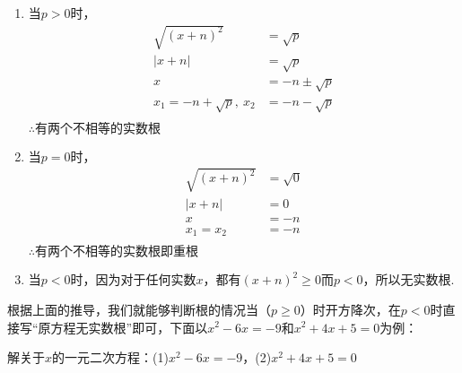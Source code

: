 \begin{enumerate}
    \item 当\(p>0\)时，
    \begin{align*}
        \sqrt{(x + n)^2}&=\sqrt{p}\\
        |x+n|&=\sqrt{p}\\
        x&=-n\pm\sqrt{p}\\
        x_1=-n + \sqrt{p},\ x_2&=-n - \sqrt{p}\\
    \end{align*}
    $\therefore \text{有两个不相等的实数根}$
    \item 当\(p=0\)时，
    \begin{align*}
        \sqrt{(x + n)^2}&=\sqrt{0}\\
        |x+n|&=0\\
        x&=-n\\
        x_1=x_2&=-n\\
    \end{align*}
    $\therefore \text{有两个不相等的实数根即重根}$
    \item 当\(p<0\)时，因为对于任何实数\(x\)，都有\((x+n)^2\ge0\)而\(p<0\)，所以无实数根.

\end{enumerate}
根据上面的推导，我们就能够判断根的情况当（\(p\ge0\)）时开方降次，在\(p<0\)时直接写“原方程无实数根”即可，下面以\( x^2 - 6x = -9 \)和\( x^2 + 4x + 5 = 0 \)为例：
\par
\begin{example}
    解关于\(x\)的一元二次方程：(1)\( x^2 - 6x = -9 \)，(2)\( x^2 + 4x + 5 = 0 \)
\end{example}

